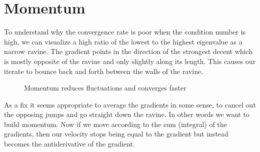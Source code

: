 
\newcommand{\momentum}{p}

\chapter{Momentum}

To understand why the convergence rate is poor when the condition
number is high, we can visualize a high ratio of the lowest to the highest
eigenvalue as a narrow ravine. The gradient points in the direction of the
strongest decent which is mostly opposite of the ravine and only slightly
along its length. This causes our iterate to bounce back and forth between
the walls of the ravine.
%
\begin{figure}[h]
	\centering
	\def\svgwidth{1\textwidth}
	
	\caption{Momentum reduces fluctuations and converges faster}
	\label{fig: visualize bad conditioning}
\end{figure}

As a fix it seems appropriate to average the gradients in some sense, to
cancel out the opposing jumps and go straight down the ravine. In other words
we want to build momentum. Now if we move according to the sum (integral) of
the gradients, then our velocity stops being equal to the gradient but instead
becomes the antiderivative of the gradient.

